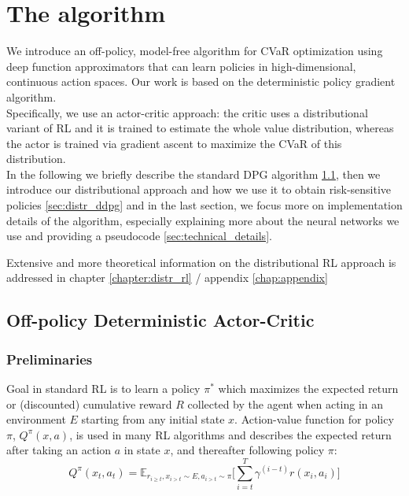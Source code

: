 \chapter{The algorithm }
\label{chapter:algo}

We introduce an off-policy, model-free algorithm for CVaR optimization using deep function approximators
that can learn policies in high-dimensional, continuous action spaces.
Our work is based on the deterministic policy gradient algorithm.\\
Specifically, we use an actor-critic approach: the critic uses a distributional variant
of RL and it is trained to estimate the whole value distribution, whereas the actor
is trained via gradient ascent to maximize the CVaR of this distribution.\\ 
In the following we briefly describe the standard DPG algorithm \ref{sec:DPG}, then we introduce
our distributional approach and how we use it to obtain risk-sensitive policies \ref{sec:distr_ddpg}
and in the last section, we focus more on implementation details of the algorithm, 
especially explaining more about the neural networks we use and providing a
pseudocode \ref{sec:technical_details}.

Extensive and more theoretical information on the distributional RL approach is addressed in 
chapter \ref{chapter:distr_rl} / appendix \ref{chap:appendix} 

\section{Off-policy Deterministic Actor-Critic} \label{sec:DPG} 
\subsection{Preliminaries}

Goal in standard RL is to learn a policy $\pi^*$ which maximizes the expected return or (discounted) cumulative
reward $R$ collected by the agent when acting in an environment $E$ starting from any initial state $x$.
Action-value function for policy $\pi$, $Q^\pi(x,a)$, is used in many RL algorithms and describes the expected return after taking
an action $a$ in state $x$, and thereafter following policy $\pi$:
\begin{equation}
    Q^\pi(x_t,a_t) = \mathbb E_{r_{i\geq t},x_{i>t} \sim E, a_{i>t}\sim \pi}\Big[  \sum_{i=t}^T \gamma^{(i-t)}r(x_i,a_i) \Big]
\end{equation}

